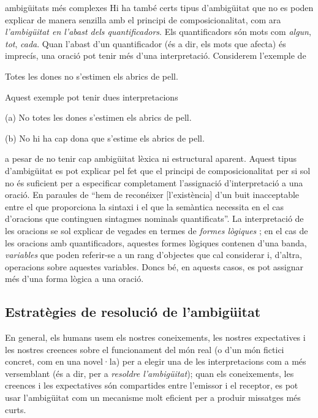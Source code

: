 \begin{persabermes}{ambigüitats més complexes}
  Hi ha també certs tipus d'ambigüitat que no es poden explicar de
  manera senzilla amb el principi de composicionalitat, com ara {\em
    l'ambigüitat en l'abast dels quantificadors}. Els quantificadors
  són mots com \emph{algun}, \emph{tot}, \emph{cada}.  Quan l'abast
  d'un quantificador (és a dir, els mots que afecta) és imprecís, una
  oració pot tenir més d'una interpretació. Considerem l'exemple de
  \cite{hutchins92b}
  \begin{exemple}
    Totes les dones no s'estimen els abrics de pell.
    \label{eq:abric}
  \end{exemple}
  Aquest exemple pot tenir dues interpretacions
  \begin{exemple}
  \item[(a)] No totes les dones s'estimen els abrics de pell.
  \item[(b)] No hi ha cap dona que s'estime els abrics de pell.
  \end{exemple}
  a pesar de no tenir cap ambigüitat lèxica ni estructural aparent.
  Aquest tipus d'ambigüitat es pot explicar pel fet que el principi de
  composicionalitat per si sol no és suficient per a especificar
  completament l'assignació d'interpretació a una oració. En paraules
  de \citet[p.~364]{radford99b} ``hem de reconéixer [l'existència]
  d'un buit inacceptable entre el que proporciona la sintaxi i el que
  la semàntica necessita en el cas d'oracions que continguen sintagmes
  nominals quantificats''. La interpretació de les oracions se sol
  explicar de vegades en termes de {\em formes lògiques}
  \citep[cap.~23]{radford09b}; en el cas de les oracions amb
  quantificadors, aquestes formes lògiques contenen d'una banda,
  \emph{variables} que poden referir-se a un rang d'objectes que cal
  considerar i, d'altra, operacions sobre aquestes variables.  Doncs
  bé, en aquests casos, es pot assignar més d'una forma lògica a una
  oració.

\mbox{}

\end{persabermes}

\subsection{Estratègies de resolució de l'ambigüitat}
En general, els humans usem els nostres coneixements, les nostres
expectatives i les nostres creences sobre el funcionament del món real
(o d'un món fictici concret, com en una novel·la) per a elegir una de
les interpretacions com a més versemblant (és a dir, per a
\emph{resoldre l'ambigüitat}); quan els coneixements, les creences i
les expectatives són compartides entre l'emissor i el receptor, es pot
usar l'ambigüitat com un mecanisme molt eficient per a produir
missatges més curts.

